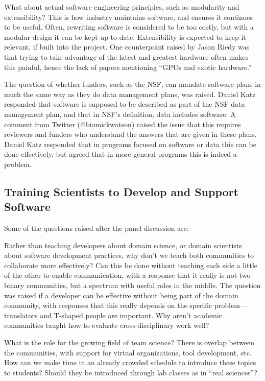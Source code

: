 \documentclass[11pt, oneside]{amsart}
\begin{document}
What about actual software engineering principles, such as modularity and
extensibility? This is how industry maintains software, and ensures it continues
to be useful. Often, rewriting software is considered to be too costly, but
with a modular design it can be kept up to date. Extensibility is expected to keep
it relevant, if built into the project. One counterpoint raised by Jason Riedy
was that trying to take advantage of the latest and greatest hardware often
makes this painful, hence the lack of papers mentioning ``GPUs and exotic
hardware.''

The question of whether funders, such as the NSF, can mandate software plans in
much the same way as they do data management plans, was raised. Daniel Katz responded that
software is supposed to be described as part of the NSF data management plan,
and that in NSF's definition, data includes software. A comment from Twitter
(@biomickwatson) raised the issue that this requires reviewers and funders who
understand the answers that are given in these plans. Daniel Katz responded
that in programs focused on software or data this can be done effectively, but
agreed that in more general programs this is indeed a problem.


\subsection{Training Scientists to Develop and Support Software}

Some of the questions raised after the panel discussion are:

Rather than teaching developers about domain science, or domain scientists about
software development practices, why don't we teach both communities to
collaborate more effectively? Can this be done without teaching each side a
little of the other to enable communication, with a response that it really is
not two binary communities, but a spectrum with useful roles in the middle.
The question was raised if a developer can be effective without being part of the
domain community, with responses that this really depends on the specific
problem---translators and T-shaped people are important. Why aren't academic
communities taught how to evaluate cross-disciplinary work well?

What is the role for the growing field of team science? There
is overlap between the communities, with support for virtual organizations,
tool development, etc. How can we make time in an already crowded schedule to
introduce these topics to students? Should they be introduced through lab
classes as in ``real sciences''?
\end{document}
